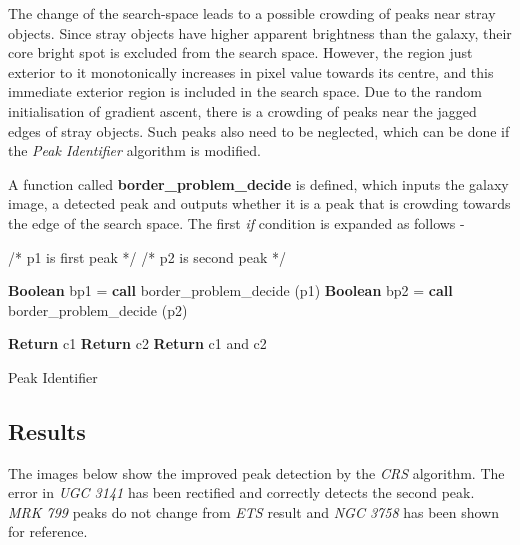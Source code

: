 \documentclass[12pt]{article}
\begin{document}
The change of the search-space leads to a possible crowding of peaks near stray objects. Since stray objects have higher apparent brightness than the galaxy, their core bright spot is excluded from the search space. However, the region just exterior to it monotonically increases in pixel value towards its centre, and this immediate exterior region is included in the search space. Due to the random initialisation of gradient ascent, there is a crowding of peaks near the jagged edges of stray objects. Such peaks also need to be neglected, which can be done if the \textit{Peak Identifier} algorithm is modified.

\bigskip

A function called \textbf{border\_problem\_decide} is defined, which inputs the galaxy image, a detected peak and outputs whether it is a peak that is crowding towards the edge of the search space. The first \textit{if} condition is expanded as follows -

\begin{algorithm}[H]
\SetAlgoLined
 
   /* p1 is first peak */ \;
   /* p2 is second peak */ \;
   {
    \textbf{Boolean} bp1 = \textbf{call} border\_problem\_decide (p1) \;
    \textbf{Boolean} bp2 = \textbf{call} border\_problem\_decide (p2) \;
    
        {
            \textbf{Return} c1 \;
        }
        {
            \textbf{Return} c2 \;
        }
        \Else
        {
            \textbf{Return} c1 and c2 \;
        }
   }
 \newline
 \caption{Peak Identifier}
\end{algorithm}

\subsection{Results}

The images below show the improved peak detection by the \textit{CRS} algorithm. The error in \textit{UGC 3141} has been rectified and correctly detects the second peak. \textit{MRK 799} peaks do not change from \textit{ETS} result and \textit{NGC 3758} has been shown for reference.
\end{document}
